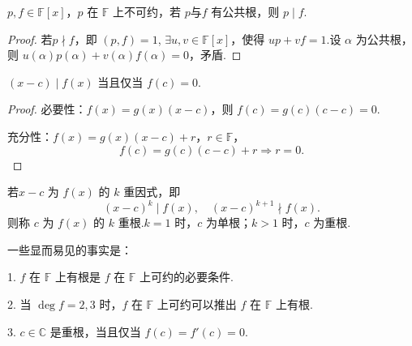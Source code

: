 \begin{proposition}
	\( p, f \in \mathbb{F}[x] \)，\( p \) 在 \(\mathbb{F}\) 上不可约，若 \( p \text{与} f \) 有公共根，则 \( p \mid f \).
	
\end{proposition}
\begin{proof}
	 若\( p \nmid f \)，即 \( (p, f) = 1 \), \( \exists u, v \in \mathbb{F}[x] \)，使得 \( up + vf = 1 \).设 \( \alpha \) 为公共根，则 \( u(\alpha) p(\alpha) + v(\alpha) f(\alpha) = 0 \)，矛盾.
\end{proof}
\begin{proposition}
	\( (x - c) \mid f(x) \) 当且仅当 \( f(c) = 0 \).
\end{proposition}
\begin{proof}
	必要性：\( f(x) = g(x)(x - c) \)，则 \( f(c) = g(c)(c - c) = 0 \).
	
	充分性：\( f(x) = g(x)(x - c) + r \)，\( r \in \mathbb{F} \)，
	\[ f(c) = g(c)(c - c) + r \Rightarrow r = 0. \]
	

\end{proof}
若\( x - c \) 为 \( f(x) \) 的 \( k \) 重因式，即
\[ (x - c)^k \mid f(x), \quad (x - c)^{k+1} \nmid f(x). \]
\label{p1:concept:c1-l1024}则称 \( c \) 为 \( f(x) \) 的 \( k \) 重根.\( k = 1 \) 时，\( c \) 为单根；\( k > 1 \) 时，\( c \) 为重根.

一些显而易见的事实是：

1. \( f \) 在 \(\mathbb{F}\) 上有根是 \( f \) 在 \(\mathbb{F}\) 上可约的必要条件.

2. 当 \( \deg f = 2, 3 \) 时，\( f \) 在 \(\mathbb{F}\) 上可约可以推出 \( f \) 在 \(\mathbb{F}\) 上有根.

3. \( c \in \mathbb{C} \) 是重根，当且仅当 \( f(c) = f'(c) = 0 \).

